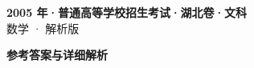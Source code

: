 \documentclass[zihao=-4, a4paper]{ctexart}
\begin{document}
\begin{center}
  {\Large\bfseries 2005 年·普通高等学校招生考试·湖北卷·文科}\\[4pt]
  {\large 数学 · 解析版}
\end{center}
\medskip
{}

\clearpage
{}
\begin{center}{\Large\bfseries 参考答案与详细解析}\end{center}
\medskip

\end{document}

